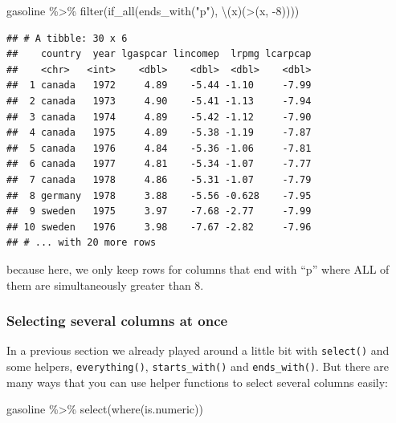\documentclass[
]{article}
\newenvironment{Shaded}{\begin{snugshade}}{\end{snugshade}}
\newcommand{\AttributeTok}[1]{\textcolor[rgb]{0.77,0.63,0.00}{#1}}
\newcommand{\DecValTok}[1]{\textcolor[rgb]{0.00,0.00,0.81}{#1}}
\newcommand{\FunctionTok}[1]{\textcolor[rgb]{0.00,0.00,0.00}{#1}}
\newcommand{\NormalTok}[1]{#1}
\newcommand{\SpecialCharTok}[1]{\textcolor[rgb]{0.00,0.00,0.00}{#1}}
\newcommand{\StringTok}[1]{\textcolor[rgb]{0.31,0.60,0.02}{#1}}
\begin{document}
\begin{Shaded}
\begin{Highlighting}[]
\NormalTok{gasoline }\SpecialCharTok{\%\textgreater{}\%}
  \FunctionTok{filter}\NormalTok{(}\FunctionTok{if\_all}\NormalTok{(}\FunctionTok{ends\_with}\NormalTok{(}\StringTok{"p"}\NormalTok{), \textbackslash{}(x)(}\StringTok{\textasciigrave{}}\AttributeTok{\textgreater{}}\StringTok{\textasciigrave{}}\NormalTok{(x, }\SpecialCharTok{{-}}\DecValTok{8}\NormalTok{))))}
\end{Highlighting}
\end{Shaded}

\begin{verbatim}
## # A tibble: 30 x 6
##    country  year lgaspcar lincomep  lrpmg lcarpcap
##    <chr>   <int>    <dbl>    <dbl>  <dbl>    <dbl>
##  1 canada   1972     4.89    -5.44 -1.10     -7.99
##  2 canada   1973     4.90    -5.41 -1.13     -7.94
##  3 canada   1974     4.89    -5.42 -1.12     -7.90
##  4 canada   1975     4.89    -5.38 -1.19     -7.87
##  5 canada   1976     4.84    -5.36 -1.06     -7.81
##  6 canada   1977     4.81    -5.34 -1.07     -7.77
##  7 canada   1978     4.86    -5.31 -1.07     -7.79
##  8 germany  1978     3.88    -5.56 -0.628    -7.95
##  9 sweden   1975     3.97    -7.68 -2.77     -7.99
## 10 sweden   1976     3.98    -7.67 -2.82     -7.96
## # ... with 20 more rows
\end{verbatim}

because here, we only keep rows for columns that end with ``p'' where ALL of them are simultaneously
greater than 8.

\hypertarget{selecting-several-columns-at-once}{%
\subsubsection{Selecting several columns at once}\label{selecting-several-columns-at-once}}

In a previous section we already played around a little bit with \texttt{select()} and some helpers,
\texttt{everything()}, \texttt{starts\_with()} and \texttt{ends\_with()}. But there are many ways that you can use
helper functions to select several columns easily:

\begin{Shaded}
\begin{Highlighting}[]
\NormalTok{gasoline }\SpecialCharTok{\%\textgreater{}\%}
  \FunctionTok{select}\NormalTok{(}\FunctionTok{where}\NormalTok{(is.numeric))}
\end{Highlighting}
\end{Shaded}
\end{document}
